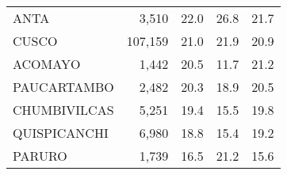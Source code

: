 \begin{tabular}{lrrrr}
	\cellcolor[HTML]{FD6864}ANTA                                       & 3,510                                                                 & 22.0                                                                             & 26.8                                                                        & 21.7                                                                                \\
	\cellcolor[HTML]{FD6864}CUSCO                                      & 107,159                                                               & 21.0                                                                             & 21.9                                                                        & 20.9                                                                                \\
	\cellcolor[HTML]{FD6864}ACOMAYO                                    & 1,442                                                                 & 20.5                                                                             & 11.7                                                                        & 21.2                                                                                \\
	\cellcolor[HTML]{FD6864}PAUCARTAMBO                                & 2,482                                                                 & 20.3                                                                             & 18.9                                                                        & 20.5                                                                                \\
	\cellcolor[HTML]{FD6864}CHUMBIVILCAS                               & 5,251                                                                 & 19.4                                                                             & 15.5                                                                        & 19.8                                                                                \\
	\cellcolor[HTML]{FD6864}QUISPICANCHI                               & 6,980                                                                 & 18.8                                                                             & 15.4                                                                        & 19.2                                                                                \\
	\cellcolor[HTML]{FFCE93}PARURO                                     & 1,739                                                                 & 16.5                                                                             & 21.2                                                                        & 15.6                                                                                \\

\end{tabular}
